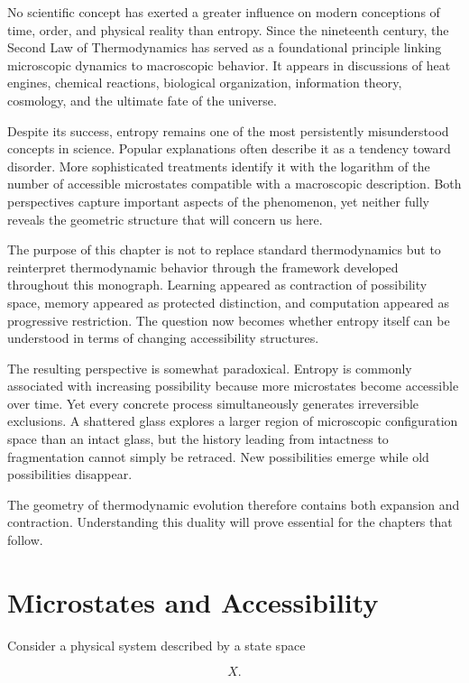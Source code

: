 \documentclass[11pt,oneside]{book}
\theoremstyle{plain}
\theoremstyle{definition}
\theoremstyle{remark}
\begin{document}
No scientific concept has exerted a greater influence on modern conceptions of time, order, and physical reality than entropy. Since the nineteenth century, the Second Law of Thermodynamics has served as a foundational principle linking microscopic dynamics to macroscopic behavior. It appears in discussions of heat engines, chemical reactions, biological organization, information theory, cosmology, and the ultimate fate of the universe.

Despite its success, entropy remains one of the most persistently misunderstood concepts in science. Popular explanations often describe it as a tendency toward disorder. More sophisticated treatments identify it with the logarithm of the number of accessible microstates compatible with a macroscopic description. Both perspectives capture important aspects of the phenomenon, yet neither fully reveals the geometric structure that will concern us here.

The purpose of this chapter is not to replace standard thermodynamics but to reinterpret thermodynamic behavior through the framework developed throughout this monograph. Learning appeared as contraction of possibility space, memory appeared as protected distinction, and computation appeared as progressive restriction. The question now becomes whether entropy itself can be understood in terms of changing accessibility structures.

The resulting perspective is somewhat paradoxical. Entropy is commonly associated with increasing possibility because more microstates become accessible over time. Yet every concrete process simultaneously generates irreversible exclusions. A shattered glass explores a larger region of microscopic configuration space than an intact glass, but the history leading from intactness to fragmentation cannot simply be retraced. New possibilities emerge while old possibilities disappear.

The geometry of thermodynamic evolution therefore contains both expansion and contraction. Understanding this duality will prove essential for the chapters that follow.

\section{Microstates and Accessibility}

Consider a physical system described by a state space

\begin{equation}
X.
\end{equation}
\end{document}
